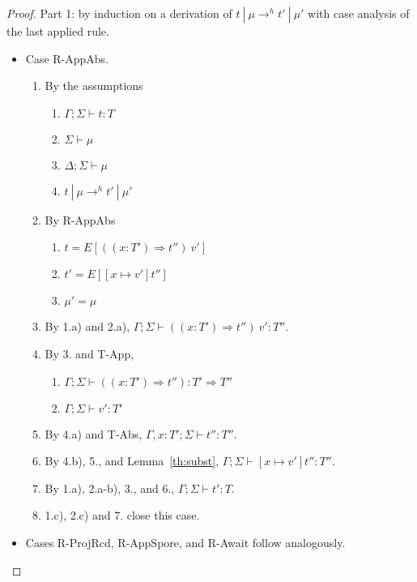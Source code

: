 \documentclass{article}
\theoremstyle{definition}
\begin{document}
\begin{proof}

Part 1: by induction on a derivation of $t~|~\mu \rightarrow^h t'~|~\mu'$ with case analysis of the last applied rule.

\begin{itemize}
\item Case R-AppAbs.
\begin{enumerate}
\item By the assumptions
  \begin{enumerate}[label=(\alph*)]
  \item $\Gamma ; \Sigma \vdash t : T$
  \item $\Sigma \vdash \mu$
  \item $\Delta ; \Sigma \vdash \mu$ 
  \item $t~|~\mu \rightarrow^h t'~|~\mu'$
  \end{enumerate}
\item By R-AppAbs
  \begin{enumerate}[label=(\alph*)]
  \item $t = E[((x : T') \Rightarrow t'')~v']$
  \item $t' = E[[x \mapsto v']t'']$
  \item $\mu' = \mu$
  \end{enumerate}
\item By 1.a) and 2.a), $\Gamma ; \Sigma \vdash ((x : T') \Rightarrow t'')~v' : T''$.
\item By 3. and T-App,
  \begin{enumerate}[label=(\alph*)]
  \item $\Gamma ; \Sigma \vdash ((x : T') \Rightarrow t'') : T' \Rightarrow T''$
  \item $\Gamma ; \Sigma \vdash v' : T'$
  \end{enumerate}
\item By 4.a) and T-Abs, $\Gamma , x : T' ; \Sigma \vdash t'' : T''$.
\item By 4.b), 5., and Lemma~\ref{th:subst}, $\Gamma ; \Sigma \vdash [x \mapsto v']t'' : T''$.
\item By 1.a), 2.a-b), 3., and 6., $\Gamma ; \Sigma \vdash t' : T$.
\item 1.c), 2.c) and 7. close this case.
\end{enumerate}

\item Cases R-ProjRcd, R-AppSpore, and R-Await follow analogously.


\end{itemize}
\end{proof}
\end{document}
